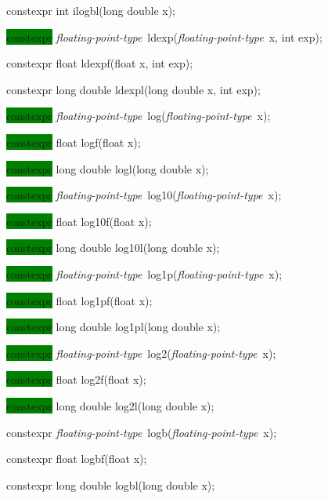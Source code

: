 \documentclass[prd,twocolumn,amsmath,amssymb,nofootinbib,eqsecnum]{revtex4-1}
\newcommand{\highlight}[1]{\colorbox{green}{\!\!\!\! #1}}
\newcommand{\oldhighlight}[1]{#1}
\newcommand{\fptype}{{\it floating-point-type}}
\begin{document}
{\oldhighlight{constexpr} int ilogbl(long double x);

\vspace{2ex}


\highlight{constexpr} \fptype\ ldexp(\fptype\ x, int exp);

\oldhighlight{constexpr} float ldexpf(float x, int exp);

\oldhighlight{constexpr} long double ldexpl(long double x, int exp);

\vspace{2ex}


\highlight{constexpr} \fptype\  log(\fptype\ x);

\highlight{constexpr} float logf(float x);

\highlight{constexpr} long double logl(long double x);

\vspace{2ex}


\highlight{constexpr} \fptype\  log10(\fptype\ x);

\highlight{constexpr} float log10f(float x);

\highlight{constexpr} long double log10l(long double x);

\vspace{2ex}


\highlight{constexpr} \fptype\ log1p(\fptype\ x);

\highlight{constexpr} float log1pf(float x);

\highlight{constexpr} long double log1pl(long double x);

\vspace{2ex}


\highlight{constexpr} \fptype\ log2(\fptype\ x);

\highlight{constexpr} float log2f(float x);

\highlight{constexpr} long double log2l(long double x);

\vspace{2ex}


\oldhighlight{constexpr} \fptype\ logb(\fptype\ x);

\oldhighlight{constexpr} float logbf(float x);

\oldhighlight{constexpr} long double logbl(long double x);

}
\end{document}
